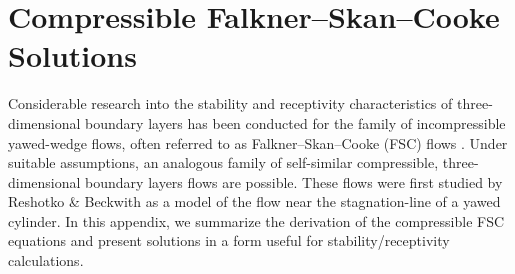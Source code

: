 %
%
%
%
%
\chapter{Compressible Falkner--Skan--Cooke Solutions \label{a:FSC}}

Considerable research into the stability and receptivity characteristics of
three-dimen\-sional boundary layers has been conducted for the family of
incompressible yawed-wedge flows, often referred to as Falkner--Skan--Cooke
(FSC) flows \cite{Cooke:50}.  Under suitable assumptions, an analogous family
of self-similar compressible, three-dimensional boundary layers flows are
possible.  These flows were first studied by Reshotko \& Beckwith
\cite{ReBe:58} as a model of the flow near the stagnation-line of a yawed
cylinder.  In this appendix, we summarize the derivation of the compressible
FSC equations and present solutions in a form useful for stability/receptivity
calculations.

